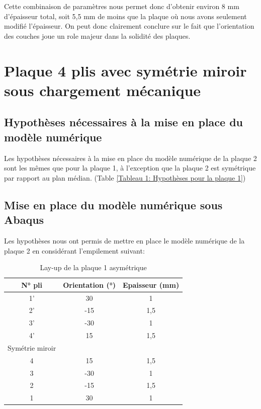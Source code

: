 \documentclass[a4paper,12pt]{article}
\begin{document}
Cette combinaison de paramètres nous permet donc d'obtenir environ 8 mm d'épaisseur total, soit 5,5 mm de moins que la plaque où nous avons seulement modifié l'épaisseur.
On peut donc clairement conclure sur le fait que l'orientation des couches joue un role majeur dans la solidité des plaques.

\section{Plaque 4 plis avec symétrie miroir sous chargement mécanique}
\subsection{Hypothèses nécessaires à la mise en place du modèle numérique}
Les hypothèses nécessaires à la mise en place du modèle numérique de la plaque 2 sont les mêmes que pour la plaque 1, à l'exception que la plaque 2 est symétrique par rapport au plan médian.
(Table \ref{Tableau 1: Hypothèses pour la plaque 1})

\subsection{Mise en place du modèle numérique sous Abaqus}
Les hypothèses nous ont permis de mettre en place le modèle numérique de la plaque 2 en considérant l'empilement suivant:

\begin{table}[h!]
	\renewcommand{\arraystretch}{1.2} %
	\centering
	\begin{tabular}{c|c|c}
		\textbf{N° pli} & \textbf{Orientation (°)} & \textbf{Epaisseur (mm)} \\
		\hline
		1'         & 30             & 1           \\
		2'          & -15              & 1,5           \\
		3'          & -30              & 1            \\
		4'         & 15              & 1,5            \\
		\hline
		Symétrie miroir \\
		\hline
		4         & 15              & 1,5            \\
		3          & -30              & 1            \\
		2          & -15              & 1,5           \\
		1         & 30             & 1           \\
	\end{tabular}
	\caption{Lay-up de la plaque 1 asymétrique}
	\label{tab:exemple_tableau}
\end{table}
\end{document}

